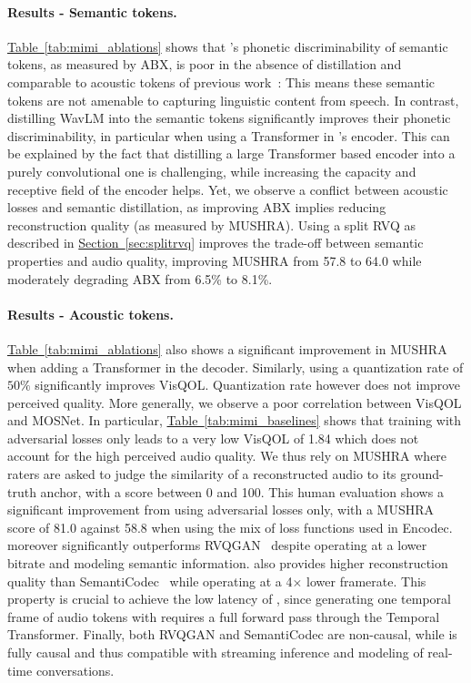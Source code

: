 \paragraph{Results - Semantic tokens.} \hyperref[tab:mimi_ablations]{Table~\ref{tab:mimi_ablations}} shows that \mimi's phonetic discriminability of semantic tokens, as measured by ABX, is poor in the absence of distillation and comparable to acoustic tokens of previous work~\citep{audiolm}: This means these semantic tokens are not amenable to capturing linguistic content from speech. In contrast, distilling WavLM into the semantic tokens significantly improves their phonetic discriminability, in particular when using a Transformer in \mimi's encoder. This can be explained by the fact that distilling a large Transformer based encoder into a purely convolutional one is challenging, while increasing the capacity and receptive field of the encoder helps. Yet,  we observe a conflict between acoustic losses and semantic distillation, as improving ABX implies reducing reconstruction quality (as measured by MUSHRA). Using a split RVQ as described in \hyperref[sec:splitrvq]{Section~\ref{sec:splitrvq}} improves the trade-off between semantic properties and audio quality, improving MUSHRA from 57.8 to 64.0 while moderately degrading ABX from 6.5\% to 8.1\%.


\paragraph{Results - Acoustic tokens.} \hyperref[tab:mimi_ablations]{Table~\ref{tab:mimi_ablations}} also shows a significant improvement in MUSHRA when adding a Transformer in the decoder. Similarly, using a quantization rate of $50\%$ significantly improves VisQOL.  Quantization rate however does not improve perceived quality. More generally, we observe a poor correlation between VisQOL and MOSNet. In particular, \hyperref[tab:mimi_baselines]{Table~\ref{tab:mimi_baselines}} shows that training \mimi with adversarial losses only leads to a very low VisQOL of 1.84 which does not account for the high perceived audio quality. We thus rely on MUSHRA where raters are asked to judge the similarity of a reconstructed audio to its ground-truth anchor, with a score between 0 and 100. This human evaluation shows a significant improvement from using adversarial losses only, with a MUSHRA score of 81.0 against 58.8 when using the mix of loss functions used in Encodec. \mimi moreover significantly outperforms RVQGAN~\citep{dac} despite operating at a lower bitrate and modeling semantic information. \mimi also provides higher reconstruction quality than SemantiCodec~\citep{liu2024semanticodec} while operating at a 4$\times$ lower framerate. This property is crucial to achieve the low latency of \ours{}, since generating one temporal frame of audio tokens with \ours{} requires a full forward pass through the Temporal Transformer. Finally, both RVQGAN and SemantiCodec are non-causal, while \mimi is fully causal and thus compatible with streaming inference and modeling of real-time conversations.

